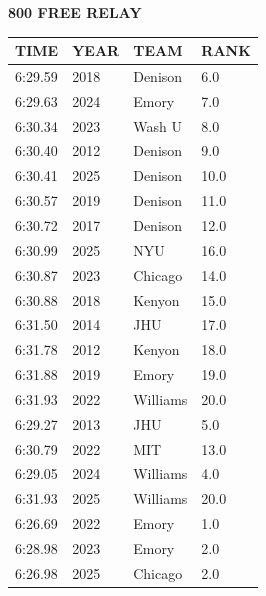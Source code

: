 \begin{table}[H]
\centering
\begin{minipage}[t]{0.6\textwidth}
\centering
\textbf{800 FREE RELAY}\\[0.1cm]
\begin{tabular}{@{}p{1.8cm}p{1.2cm}p{1.4cm}p{0.8cm}@{}}
\hline
    \textbf{TIME} & \textbf{YEAR} & \textbf{TEAM} & \textbf{RANK} \\
\hline
    6:29.59 & 2018 & Denison & 6.0 \\
    6:29.63 & 2024 & Emory & 7.0 \\
    6:30.34 & 2023 & Wash U & 8.0 \\
    6:30.40 & 2012 & Denison & 9.0 \\
    6:30.41 & 2025 & Denison & 10.0 \\
    6:30.57 & 2019 & Denison & 11.0 \\
    6:30.72 & 2017 & Denison & 12.0 \\
    6:30.99 & 2025 & NYU & 16.0 \\
    6:30.87 & 2023 & Chicago & 14.0 \\
    6:30.88 & 2018 & Kenyon & 15.0 \\
    6:31.50 & 2014 & JHU & 17.0 \\
    6:31.78 & 2012 & Kenyon & 18.0 \\
    6:31.88 & 2019 & Emory & 19.0 \\
    6:31.93 & 2022 & Williams & 20.0 \\
    6:29.27 & 2013 & JHU & 5.0 \\
    6:30.79 & 2022 & MIT & 13.0 \\
    6:29.05 & 2024 & Williams & 4.0 \\
    6:31.93 & 2025 & Williams & 20.0 \\
    6:26.69 & 2022 & Emory & 1.0 \\
    6:28.98 & 2023 & Emory & 2.0 \\
    6:26.98 & 2025 & Chicago & 2.0 \\
\hline
\end{tabular}
\end{minipage}
\end{table}

